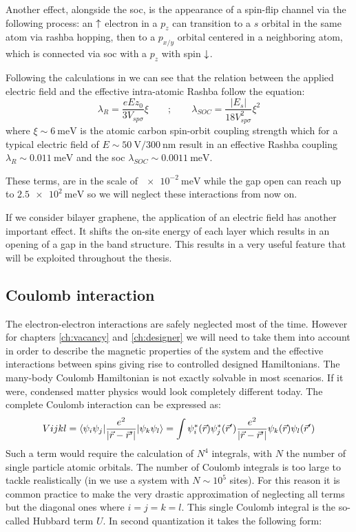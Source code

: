 Another effect, alongside the \ac{soc}, is the appearance of a spin-flip channel via the following process: an $\uparrow$ electron in a $p_z$ can transition to a $s$ orbital in the same atom via rashba hopping, then to a $p_{x/y}$ orbital centered in a neighboring atom, which is connected via \ac{soc} with a $p_z$ with spin $\downarrow$.

Following the calculations in \cite{Min2006} we can see that the relation between the applied electric field and the effective intra-atomic Rashba follow the equation:
\begin{equation}
   \lambda_R=\frac{eEz_0}{3V_{sp\sigma}}\xi \qquad;\qquad
   \lambda_{SOC}=\frac{|E_{s}|}{18V^2_{sp\sigma}}\xi^2
\end{equation}
where $\xi\sim\SI{6}{\meV}$ is the atomic carbon spin-orbit coupling strength
which for a typical electric field of $E\sim\SI{50}{\V}/\SI{300}{\nm}$ result in an effective Rashba coupling $\lambda_R\sim\SI{0.011}{\meV}$ and the \ac{soc} $\lambda_{SOC}\sim\SI{0.0011}{\meV}$.

These terms, are in the scale of $\SI{e-2}{\meV}$ while the gap open can reach up to $\SI{2.5e2}{\meV}$ so we will neglect these interactions from now on.
\bigskip


If we consider bilayer graphene, the application of an electric field has another important effect. It shifts the on-site energy of each layer which results in an opening of a gap in the band structure. This results in a very useful feature that will be exploited throughout the thesis.

\subsection{Coulomb interaction}
The electron-electron interactions are safely neglected most of the time. However for chapters \ref{ch:vacancy} and \ref{ch:designer} we will need to take them into account in order to describe the magnetic properties of the system and the effective interactions between spins giving rise to controlled designed Hamiltonians.
The many-body Coulomb Hamiltonian is not exactly solvable in most scenarios. If it were, condensed matter physics would %
look completely different today.
The complete Coulomb interaction can be expressed as:
\begin{equation}
   V{ijkl} = \langle\psi_i\psi_j|\frac{e^2}{|\vec{r}-\vec{r}'|}|\psi_k\psi_l\rangle=
   \int\psi^*_i(\vec{r}) \psi^*_j(\vec{r}')
   \frac{e^2}{|\vec{r}-\vec{r}'|}
   \psi_k(\vec{r})\psi_l(\vec{r}')
\end{equation}
Such a term would require the calculation of $N^4$ integrals, with $N$ the number of single particle atomic orbitals. The number of Coulomb integrals is too large to tackle realistically (in  we use a system with $N\sim10^5$ sites). For this reason it is common practice to make the very drastic approximation of neglecting all terms but the diagonal ones where $i=j=k=l$.
This single Coulomb integral is the so-called Hubbard term $U$. In second quantization it takes the following form:

